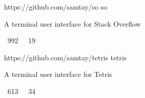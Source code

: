 \vspace{0.25em}
\begin{cvprojects}
  \cvproject
    {https://github.com/samtay/so}
    {so}
    {\begin{cvitems}
        \item A terminal user interface for Stack Overflow
        \item {\color{graytext} \faStarO \, 992 $\;$ \faCodeFork \, 19}
     \end{cvitems}}
  \cvproject
    {https://github.com/samtay/tetris}
    {tetris}
    {\begin{cvitems}
        \item A terminal user interface for Tetris
        \item {\color{graytext} \faStarO \, 613 $\;$ \faCodeFork \, 34}
     \end{cvitems}}
\end{cvprojects}
